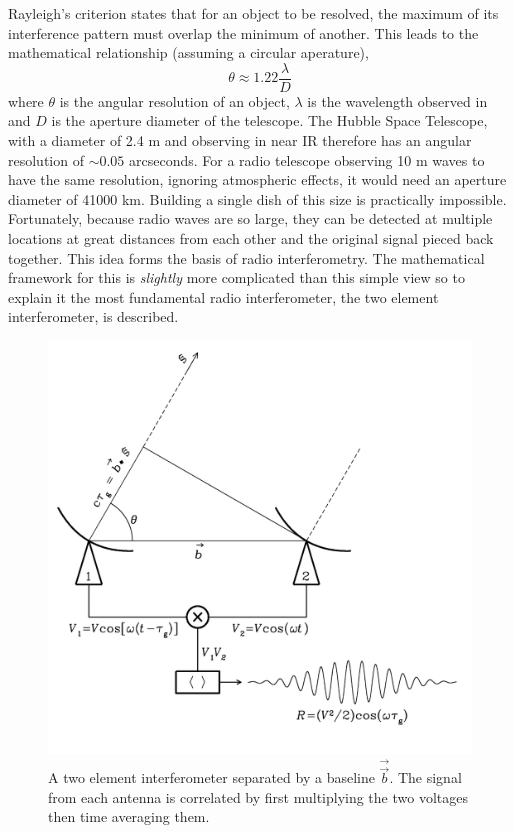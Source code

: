 Rayleigh's criterion states that for an object to be resolved, the maximum of its interference pattern must overlap the minimum of another. This leads to the mathematical relationship (assuming a circular aperature), $$\theta \approx 1.22 \frac{\lambda}{D}$$ where $\theta$ is the angular resolution of an object, $\lambda$ is the wavelength observed in and $D$ is the aperture diameter of the telescope. The Hubble Space Telescope, with a diameter of 2.4 m and observing in near IR therefore has an angular resolution of $\sim 0.05$ arcseconds. For a radio telescope observing 10 m waves to have the same resolution, ignoring atmospheric effects, it would need an aperture diameter of 41000 km. Building a single dish of this size is practically impossible. Fortunately, because radio waves are so large, they can be detected at multiple locations at great distances from each other and the original signal pieced back together. This idea forms the basis of radio interferometry.
The mathematical framework for this is \textit{slightly} more complicated than this simple view so to explain it the most fundamental radio interferometer, the two element interferometer, is described.

\begin{figure}
    \centering
    \includegraphics[width=0.5\columnwidth]{Images/2_elem_int.png}
    \caption[A two element interferometer]{A two element interferometer separated by a baseline $\overrightarrow{\Vec{b}}$. The signal from each antenna is correlated by first multiplying the two voltages then time averaging them.}
    \label{fig:2_el_int}
\end{figure}


